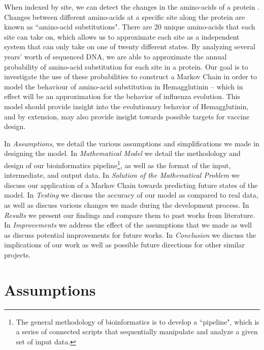 \documentclass[12pt]{article}
\begin{document}
\begin{multicols}{2}
When indexed by site, we can detect the changes in the amino-acids of a protein \citep{kosakovsky2005not}. Changes between different amino-acids at a specific site along the protein are known as ``amino-acid substitutions". There are 20 unique amino-acids that each site can take on, which allows us to approximate each site as a independent system that can only take on one of twenty different states. By analyzing several years' worth of sequenced DNA, we are able to approximate the annual probability of amino-acid substitution for each site in a protein. Our goal is to investigate the use of these probabilities to construct a Markov Chain in order to model the behaviour of amino-acid substitution in Hemagglutinin -- which in effect will be an approximation for the behavior of influenza evolution. This model should provide insight into the evolutionary behavior of Hemagglutinin, and by extension, may also provide insight towards possible targets for vaccine design.

In \textit{Assumptions}, we detail the various assumptions and simplifications we made in designing the model. In \textit{Mathematical Model} we detail the methodology and design of our bioinformatics pipeline\footnote{The general methodology of bioinformatics is to develop a ``pipeline", which is a series of connected scripts that sequentially manipulate and analyze a given set of input data.}, as well as the format of the input, intermediate, and output data. In \textit{Solution of the Mathematical Problem} we discuss our application of a Markov Chain towards predicting future states of the model. In \textit{Testing} we discuss the accuracy of our model as compared to real data, as well as discuss various changes we made during the development process. In \textit{Results} we present our findings and compare them to past works from literature. In \textit{Improvements} we address the effect of the assumptions that we made as well as discuss potential improvements for future works. In \textit{Conclusion} we discuss the implications of our work as well as possible future directions for other similar projects.

\section{Assumptions}


\end{multicols}
\end{document}
